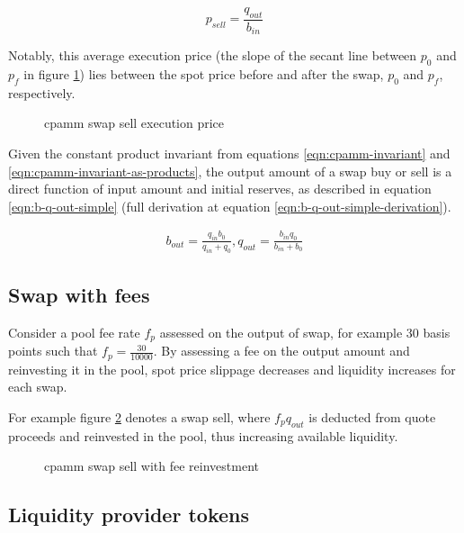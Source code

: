 \documentclass[table, twocolumn]{article}
\begin{document}
\begin{equation} \label{eqn:cpamm-avg-execution-price}
  p_{sell} = \frac{q_{out}}{b_{in}}
\end{equation}

Notably, this average execution price (the slope of the secant line between $p_0$ and
$p_f$ in figure \ref{fig:cpamm-swap-sell-price}) lies between the spot price before and
after the swap, $p_0$ and $p_f$, respectively.

\begin{figure}[!htb]
  \centering
  
  \caption{\gls{cpamm} swap sell execution price}
  \label{fig:cpamm-swap-sell-price}
\end{figure}

Given the constant product invariant from equations \ref{eqn:cpamm-invariant} and
\ref{eqn:cpamm-invariant-as-products}, the output amount of a swap buy or sell is a
direct function of input amount and initial reserves, as described in equation
\ref{eqn:b-q-out-simple} (full derivation at equation
\ref{eqn:b-q-out-simple-derivation}).

\begin{align} \label{eqn:b-q-out-simple}
  b_{out} = \frac{q_{in} b_0}{q_{in} + q_0}, q_{out} = \frac{b_{in} q_0}{b_{in} + b_0}
\end{align}

\subsection{Swap with fees}

Consider a pool fee rate $f_p$ assessed on the output of swap, for example 30 basis
points such that $f_p = \frac{30}{10000}$. By assessing a fee on the output amount and
reinvesting it in the pool, spot price slippage decreases and liquidity increases for
each swap.

For example figure \ref{fig:cpamm-swap-sell-with-fee} denotes a swap sell, where
$f_p q_{out}$ is deducted from quote proceeds and reinvested in the pool, thus
increasing available liquidity.

\begin{figure}[!htb]
  \centering
  
  \caption{\gls{cpamm} swap sell with fee reinvestment}
  \label{fig:cpamm-swap-sell-with-fee}
\end{figure}

\subsection{Liquidity provider tokens}
\end{document}
